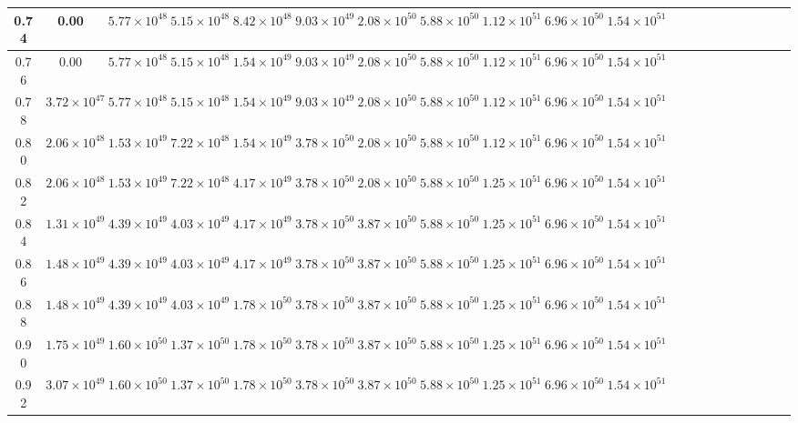 \begin{table*}
\begin{tabular}{ccccccccccccccccccccc}
\hline
0.74  &0.00 &$5.77\times 10^{48}$ &$5.15\times 10^{48}$ &$8.42\times 10^{48}$ &$9.03\times 10^{49}$ &$2.08\times 10^{50}$ &$5.88\times 10^{50}$ &$1.12\times 10^{51}$ &$6.96\times 10^{50}$ &$1.54\times 10^{51}$ \\
\hline
0.76  &0.00 &$5.77\times 10^{48}$ &$5.15\times 10^{48}$ &$1.54\times 10^{49}$ &$9.03\times 10^{49}$ &$2.08\times 10^{50}$ &$5.88\times 10^{50}$ &$1.12\times 10^{51}$ &$6.96\times 10^{50}$ &$1.54\times 10^{51}$ \\
\hline
0.78  &$3.72\times 10^{47}$ &$5.77\times 10^{48}$ &$5.15\times 10^{48}$ &$1.54\times 10^{49}$ &$9.03\times 10^{49}$ &$2.08\times 10^{50}$ &$5.88\times 10^{50}$ &$1.12\times 10^{51}$ &$6.96\times 10^{50}$ &$1.54\times 10^{51}$ \\
\hline
0.80  &$2.06\times 10^{48}$ &$1.53\times 10^{49}$ &$7.22\times 10^{48}$ &$1.54\times 10^{49}$ &$3.78\times 10^{50}$ &$2.08\times 10^{50}$ &$5.88\times 10^{50}$ &$1.12\times 10^{51}$ &$6.96\times 10^{50}$ &$1.54\times 10^{51}$ \\
\hline
0.82  &$2.06\times 10^{48}$ &$1.53\times 10^{49}$ &$7.22\times 10^{48}$ &$4.17\times 10^{49}$ &$3.78\times 10^{50}$ &$2.08\times 10^{50}$ &$5.88\times 10^{50}$ &$1.25\times 10^{51}$ &$6.96\times 10^{50}$ &$1.54\times 10^{51}$ \\
\hline
0.84  &$1.31\times 10^{49}$ &$4.39\times 10^{49}$ &$4.03\times 10^{49}$ &$4.17\times 10^{49}$ &$3.78\times 10^{50}$ &$3.87\times 10^{50}$ &$5.88\times 10^{50}$ &$1.25\times 10^{51}$ &$6.96\times 10^{50}$ &$1.54\times 10^{51}$ \\
\hline
0.86  &$1.48\times 10^{49}$ &$4.39\times 10^{49}$ &$4.03\times 10^{49}$ &$4.17\times 10^{49}$ &$3.78\times 10^{50}$ &$3.87\times 10^{50}$ &$5.88\times 10^{50}$ &$1.25\times 10^{51}$ &$6.96\times 10^{50}$ &$1.54\times 10^{51}$ \\
\hline
0.88  &$1.48\times 10^{49}$ &$4.39\times 10^{49}$ &$4.03\times 10^{49}$ &$1.78\times 10^{50}$ &$3.78\times 10^{50}$ &$3.87\times 10^{50}$ &$5.88\times 10^{50}$ &$1.25\times 10^{51}$ &$6.96\times 10^{50}$ &$1.54\times 10^{51}$ \\
\hline
0.90  &$1.75\times 10^{49}$ &$1.60\times 10^{50}$ &$1.37\times 10^{50}$ &$1.78\times 10^{50}$ &$3.78\times 10^{50}$ &$3.87\times 10^{50}$ &$5.88\times 10^{50}$ &$1.25\times 10^{51}$ &$6.96\times 10^{50}$ &$1.54\times 10^{51}$ \\
\hline
0.92  &$3.07\times 10^{49}$ &$1.60\times 10^{50}$ &$1.37\times 10^{50}$ &$1.78\times 10^{50}$ &$3.78\times 10^{50}$ &$3.87\times 10^{50}$ &$5.88\times 10^{50}$ &$1.25\times 10^{51}$ &$6.96\times 10^{50}$ &$1.54\times 10^{51}$ \\

\end{tabular}
\end{table*}
